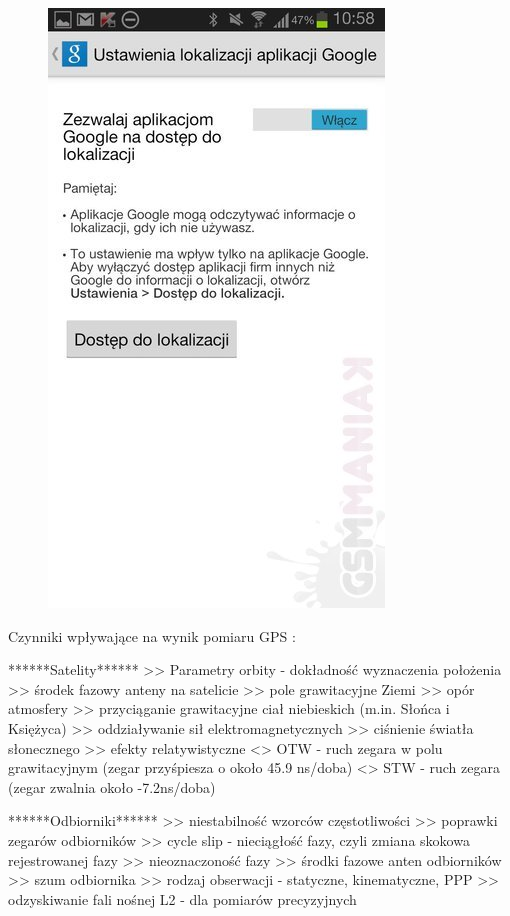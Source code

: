 \begin{figure}[H]
\centering
\includegraphics[scale=0.5]{czlonkowie/5/6ss.jpg}
\end{figure}


Czynniki wpływające na wynik pomiaru GPS : \newline

******Satelity******
>>   Parametry orbity - dokładność wyznaczenia położenia
>>   środek fazowy anteny na satelicie
>>   pole grawitacyjne Ziemi
>>   opór atmosfery
>>   przyciąganie grawitacyjne ciał niebieskich (m.in. Słońca i Księżyca)
>>   oddziaływanie sił elektromagnetycznych
>>   ciśnienie światła słonecznego
>>   efekty relatywistyczne
     <>  OTW - ruch zegara w polu grawitacyjnym (zegar przyśpiesza o około 45.9 ns/doba)
     <>  STW - ruch zegara (zegar zwalnia około -7.2ns/doba)\newline

******Odbiorniki******
>>   niestabilność wzorców częstotliwości
>>   poprawki zegarów odbiorników
>>   cycle slip - nieciągłość fazy, czyli zmiana skokowa rejestrowanej fazy
>>   nieoznaczoność fazy
>>   środki fazowe anten odbiorników
>>   szum odbiornika
>>   rodzaj obserwacji - statyczne, kinematyczne, PPP
>>   odzyskiwanie fali nośnej L2 - dla pomiarów precyzyjnych\newline

